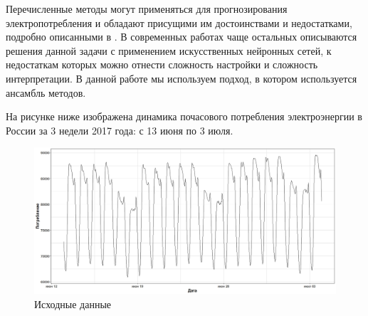 \documentclass[60x84/16,8pt]{ittmm}
\begin{document}
Перечисленные методы могут применяться для прогнозирования электропотребления и обладают присущими им достоинствами и недостатками, подробно описанными в \cite{Tihonov2006}. В современных работах чаще остальных описываются решения данной задачи с применением искусственных нейронных сетей, к недостаткам которых можно отнести сложность настройки и сложность интерпретации. В данной работе мы используем подход, в котором используется ансамбль методов.

На рисунке ниже изображена динамика почасового потребления электроэнергии в России за 3 недели 2017 года: с 13 июня по 3 июля.
\begin{figure}
  \centering
  \includegraphics[width=0.8\linewidth]{Ru/train_dataset.jpeg}
  \caption{Исходные данные}
  \label{fig:data}
\end{figure}
\end{document}
